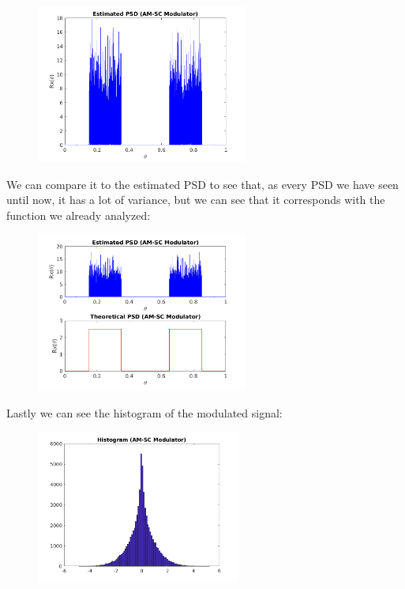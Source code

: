 \documentclass[a4paper,11pt]{article}
\begin{document}
\begin{figure}[!hp]
    \begin{center}
      \includegraphics[width=0.62\textwidth]{images/study3/R_es_am.png}
    \end{center}
\end{figure}

We can compare it to the estimated PSD to see that, as every PSD we have seen
until now, it has a lot of variance, but we can see that it corresponds with
the function we already analyzed:

\begin{figure}[!hp]
    \begin{center}
      \includegraphics[width=0.62\textwidth]{images/study3/comp_psd_am.png}
    \end{center}
\end{figure}

\newpage

Lastly we can see the histogram of the modulated signal:

\begin{figure}[!hp]
    \begin{center}
      \includegraphics[width=0.6\textwidth]{images/study3/hist_am.png}
    \end{center}
\end{figure}
\end{document}
